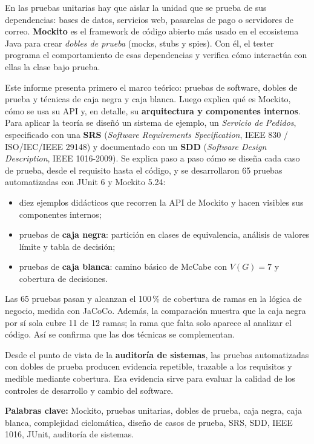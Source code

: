 \documentclass[11pt,a4paper,oneside]{report}
\begin{document}
En las pruebas unitarias hay que aislar la unidad que se prueba de sus dependencias: bases de datos, servicios web, pasarelas de pago o servidores de correo. \textbf{Mockito} es el framework de código abierto más usado en el ecosistema Java para crear \emph{dobles de prueba} (mocks, stubs y spies). Con él, el tester programa el comportamiento de esas dependencias y verifica cómo interactúa con ellas la clase bajo prueba.

Este informe presenta primero el marco teórico: pruebas de software, dobles de prueba y técnicas de caja negra y caja blanca. Luego explica qué es Mockito, cómo se usa su API y, en detalle, su \textbf{arquitectura y componentes internos}. Para aplicar la teoría se diseñó un sistema de ejemplo, un \emph{Servicio de Pedidos}, especificado con una \textbf{SRS} (\emph{Software Requirements Specification}, IEEE 830 / ISO/IEC/IEEE 29148) y documentado con un \textbf{SDD} (\emph{Software Design Description}, IEEE 1016-2009). Se explica paso a paso cómo se diseña cada caso de prueba, desde el requisito hasta el código, y se desarrollaron 65 pruebas automatizadas con JUnit 6 y Mockito 5.24:
\begin{itemize}
  \item diez ejemplos didácticos que recorren la API de Mockito y hacen visibles sus componentes internos;
  \item pruebas de \textbf{caja negra}: partición en clases de equivalencia, análisis de valores límite y tabla de decisión;
  \item pruebas de \textbf{caja blanca}: camino básico de McCabe con $V(G)=7$ y cobertura de decisiones.
\end{itemize}
Las 65 pruebas pasan y alcanzan el 100\,\% de cobertura de ramas en la lógica de negocio, medida con JaCoCo. Además, la comparación muestra que la caja negra por sí sola cubre 11 de 12 ramas; la rama que falta solo aparece al analizar el código. Así se confirma que las dos técnicas se complementan.

Desde el punto de vista de la \textbf{auditoría de sistemas}, las pruebas automatizadas con dobles de prueba producen evidencia repetible, trazable a los requisitos y medible mediante cobertura. Esa evidencia sirve para evaluar la calidad de los controles de desarrollo y cambio del software.

\medskip
\noindent\textbf{Palabras clave:} Mockito, pruebas unitarias, dobles de prueba, caja negra, caja blanca, complejidad ciclomática, diseño de casos de prueba, SRS, SDD, IEEE 1016, JUnit, auditoría de sistemas.
\end{document}
